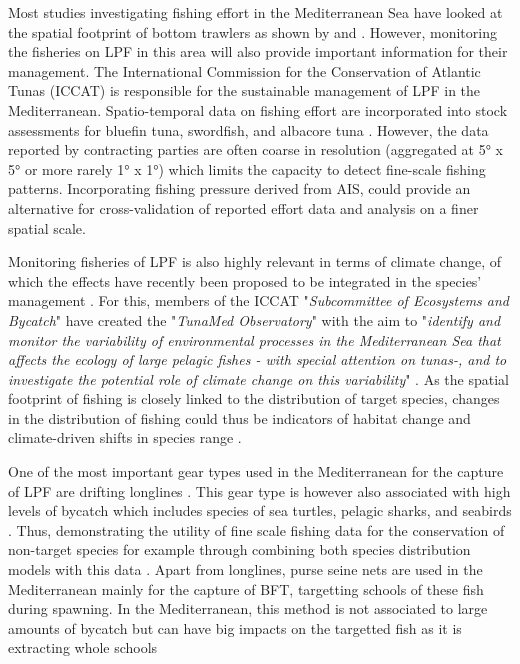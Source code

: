 \medskip

Most studies investigating fishing effort in the Mediterranean Sea have looked at the spatial
footprint of bottom trawlers as shown by \cite{ferra_trawlers_change} and
\cite{marsaglia_trawling}. However, monitoring the fisheries on LPF in this area will also provide
important information for their management. The International Commission for the Conservation of
Atlantic Tunas (ICCAT) is responsible for the sustainable management of LPF in the Mediterranean.
Spatio-temporal data on fishing effort are incorporated into stock assessments for bluefin tuna,
swordfish, and albacore tuna \citep{iccat_bft_summary,iccat_swo_summary,iccat_alb_summary}.
However, the data reported by contracting parties are often coarse in resolution (aggregated at 5°
x 5° or more rarely 1° x 1°) which limits the capacity to detect fine-scale fishing patterns.
Incorporating fishing pressure derived from AIS, could provide an alternative for cross-validation
of reported effort data and analysis on a finer spatial scale.

\medskip

Monitoring fisheries of LPF is also highly relevant in terms of climate change, of which the
effects have recently been proposed to be integrated in the species' management
\citep{iccat_climate_change}. For this, members of the ICCAT "\textit{Subcommittee of Ecosystems
	and Bycatch}" have created the "\textit{TunaMed Observatory}" with the aim to "\textit{identify and
	monitor the variability of environmental processes in the Mediterranean Sea that affects the
	ecology of large pelagic fishes - with special attention on tunas-, and to investigate the
	potential role of climate change on this variability}" \citep{tunamed}. As the spatial footprint of
fishing is closely linked to the distribution of target species, changes in the distribution of
fishing could thus be indicators of habitat change and climate-driven shifts in species range
\citep{fishing_climate_change_shifts}.

\medskip

One of the most important gear types used in the Mediterranean for the capture of LPF are drifting
longlines \citep{FAO2025Longlines,iccat_alb_summary,iccat_bft_summary,iccat_swo_summary}. This gear
type is however also associated with high levels of bycatch which includes species of sea turtles,
pelagic sharks, and seabirds \citep{bycatch_book}. Thus, demonstrating the utility of fine scale
fishing data for the conservation of non-target species for example through combining both species
distribution models with this data \citep{welch_overlap_ais_bycatch}. Apart from longlines, purse
seine nets are used in the Mediterranean mainly for the capture of BFT, targetting schools of these
fish during spawning. In the Mediterranean, this method is not associated to large amounts of
bycatch but can have big impacts on the targetted fish as it is extracting whole schools
\citep{bycatch_book,iccat_bft_summary}

